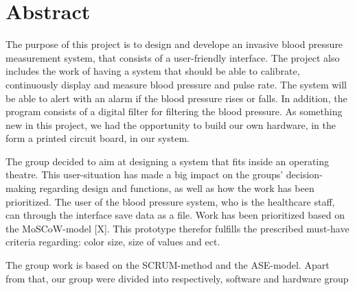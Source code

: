 {\let\clearpage\relax \chapter*{Abstract}}

The purpose of this project is to design and develope an invasive blood pressure measurement system, that consists of a user-friendly interface. The project also includes the work of having a system that should be able to calibrate, continuously display and measure blood pressure and pulse rate. The system will be able to alert with an alarm if the blood pressure rises or falls. In addition, the program consists of a digital filter for filtering the blood pressure. As something new in this project, we had the opportunity to build our own hardware, in the form a printed circuit board, in our system. 

The group decided to aim at designing a system that fits inside an operating theatre. This user-situation has made a big impact on the groups' decision-making regarding design and functions, as well as how the work has been prioritized. The user of the blood pressure system, who is the healthcare staff, can through the interface save data as a file. 
Work has been prioritized based on the MoSCoW-model [X]. This prototype therefor fulfills the prescribed must-have criteria regarding: color size, size of values and ect. 

The group work is based on the SCRUM-method and the ASE-model. Apart from that, our group were divided into respectively, software and hardware group



\clearpage
